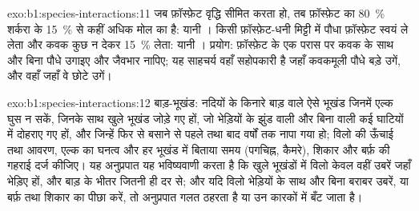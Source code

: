 \begin{solution}{exo:b1:species-interactions:11}
जब फ़ॉस्फ़ेट वृद्धि सीमित करता हो, तब फ़ॉस्फ़ेट का \qty{80}{\%}
शर्करा के \qty{15}{\%} से कहीं अधिक मोल का है: यानी । किसी
फ़ॉस्फ़ेट-धनी मिट्टी में पौधा फ़ॉस्फ़ेट स्वयं ले लेता और कवक
कुछ न देकर \qty{15}{\%} लेता: यानी । प्रयोग: फ़ॉस्फ़ेट के एक परास
पर कवक के साथ और बिना पौधे उगाइए और जैवभार नापिए; यह साहचर्य वहाँ
सहोपकारी है जहाँ कवकमूली पौधे बड़े उगें, और  वहाँ जहाँ वे छोटे उगें।
\end{solution}

\begin{solution}{exo:b1:species-interactions:12}
बाड़-भूखंड: नदियों के किनारे बाड़ वाले ऐसे भूखंड जिनमें एल्क घुस न सकें,
जिनके साथ खुले भूखंड जोड़े गए हों, जो भेड़ियों के झुंड वाली और बिना वाली
कई घाटियों में दोहराए गए हों, और जिन्हें फिर से बसाने से पहले तथा बाद
वर्षों तक नापा गया हो; विलो की ऊँचाई तथा आवरण, एल्क का घनत्व और हर भूखंड
में बिताया समय (पगचिह्न, कैमरे), शिकार और बर्फ़ की गहराई दर्ज कीजिए।
यह अनुप्रपात यह भविष्यवाणी करता है कि खुले भूखंडों में विलो केवल वहीं
उबरें जहाँ भेड़िए हों, और बाड़ के भीतर जितनी ही दर से; और यदि विलो
भेड़ियों के साथ और बिना बराबर उबरें, या बर्फ़ तथा शिकार का पीछा करें, तो
अनुप्रपात गलत ठहरता है या उन कारकों में बँट जाता है।
\end{solution}

